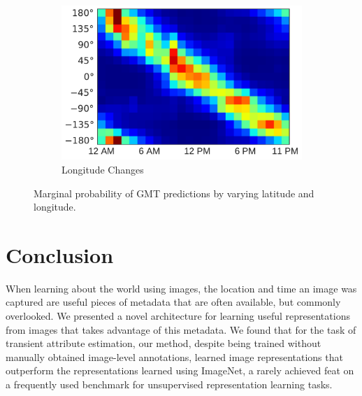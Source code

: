 \documentclass{bmvc2k}
\begin{document}
\begin{figure}
\begin{subfigure}[b]{.33\linewidth}
  \end{subfigure}
  \begin{subfigure}[b]{.338\linewidth}
    \includegraphics[width=\linewidth]{time_estimation/49-lon-hour}
    \caption{Longitude Changes}
  \end{subfigure}

  \caption{Marginal probability of GMT predictions by varying latitude
  and longitude.}
  
  \label{fig:hour-change}
\end{figure}


\section{Conclusion}

When learning about the world using images, the location and time an
image was captured are useful pieces of metadata that are often
available, but commonly overlooked. We presented a novel architecture
for learning useful representations from images that takes advantage
of this metadata. We found that for the task of transient attribute
estimation, our method, despite being trained without manually
obtained image-level annotations, learned image representations that
outperform the representations learned using ImageNet, a rarely
achieved feat on a frequently used benchmark for unsupervised
representation learning tasks.

{
\small

}

\appendix
\end{document}

